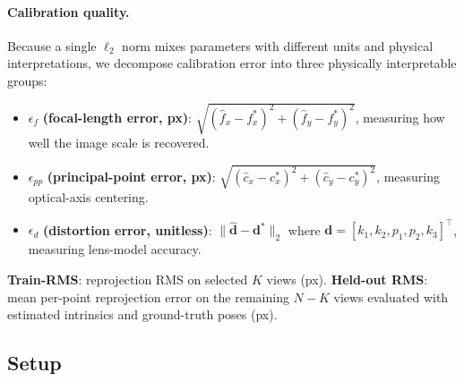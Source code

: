 \documentclass[letterpaper, 9
 pt, conference]{ieeeconf}
\begin{document}
\paragraph{Calibration quality.}
Because a single $\ell_2$ norm mixes parameters with different units and
physical interpretations, we decompose calibration error into three
physically interpretable groups:
\begin{itemize}[leftmargin=1.5em]
  \item $\epsilon_f$ \textbf{(focal-length error, px)}: $\sqrt{(\hat{f}_x - f_x^*)^2 + (\hat{f}_y - f_y^*)^2}$, measuring how well the image scale is recovered.
  \item $\epsilon_{pp}$ \textbf{(principal-point error, px)}: $\sqrt{(\hat{c}_x - c_x^*)^2 + (\hat{c}_y - c_y^*)^2}$, measuring optical-axis centering.
  \item $\epsilon_d$ \textbf{(distortion error, unitless)}: $\|\hat{\mathbf{d}} - \mathbf{d}^*\|_2$ where $\mathbf{d} = [k_1, k_2, p_1, p_2, k_3]^\top$, measuring lens-model accuracy.
\end{itemize}
\textbf{Train-RMS}: reprojection RMS on selected $K$ views (px).
\textbf{Held-out RMS}: mean per-point reprojection error on the remaining
$N-K$ views evaluated with estimated intrinsics and ground-truth poses (px).

\subsection{Setup}
\end{document}
